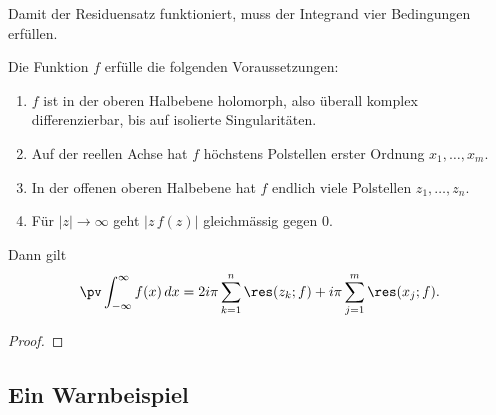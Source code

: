 Damit der Residuensatz funktioniert, muss der Integrand vier Bedingungen
erfüllen.

\begin{satz}
\label{hauptwert:satz:hauptformel}
Die Funktion $f$ erfülle die folgenden Voraussetzungen:
\begin{enumerate}
  \item $f$ ist in der oberen Halbebene holomorph, also überall komplex
  differenzierbar, bis auf isolierte Singularitäten.
  \item Auf der reellen Achse hat $f$ höchstens Polstellen erster Ordnung
  $x_1,\dots,x_m$.
  \item In der offenen oberen Halbebene hat $f$ endlich viele Polstellen
  $z_1,\dots,z_n$.
  \item Für $|z| \to \infty$ geht $|z\,f(z)|$ gleichmässig gegen $0$.
\end{enumerate}
Dann gilt
\begin{equation}
  \pv \int_{-\infty}^{\infty} f(x)\,dx
  =
  2i\pi \sum_{k=1}^{n} \res(z_k; f)
  +
  i\pi \sum_{j=1}^{m} \res(x_j; f).
  \label{hauptwert:equation:hauptformel}
\end{equation}
\end{satz}

\begin{proof}
\end{proof}


\subsection{Ein Warnbeispiel
\label{hauptwert:subsection:warnbeispiel}}
